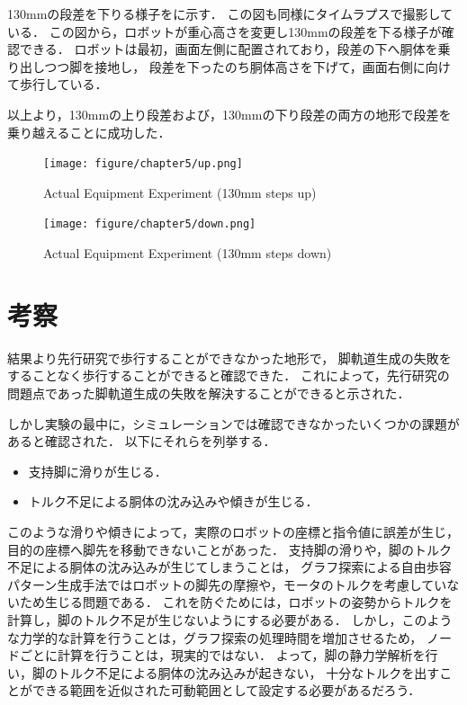 130mmの段差を下りる様子をに示す．
この図も同様にタイムラプスで撮影している．
この図から，ロボットが重心高さを変更し130mmの段差を下る様子が確認できる．
ロボットは最初，画面左側に配置されており，段差の下へ胴体を乗り出しつつ脚を接地し，
段差を下ったのち胴体高さを下げて，画面右側に向けて歩行している．

以上より，130mmの上り段差および，130mmの下り段差の両方の地形で段差を乗り越えることに成功した．

\begin{figure}[h]
  \centering
  \texttt{[image: figure/chapter5/up.png]}
  \caption{Actual Equipment Experiment (130mm steps up)}
  \label{fig:ch5_experiment_1}  %
\end{figure}

\begin{figure}[h]
  \centering
  \texttt{[image: figure/chapter5/down.png]}
  \caption{Actual Equipment Experiment (130mm steps down)}
  \label{fig:ch5_experiment_2}  %
\end{figure}

\section{考察}
結果より先行研究で歩行することができなかった地形で，
脚軌道生成の失敗をすることなく歩行することができると確認できた．
これによって，先行研究の問題点であった脚軌道生成の失敗を解決することができると示された．

しかし実験の最中に，シミュレーションでは確認できなかったいくつかの課題があると確認された．
以下にそれらを列挙する．

\begin{itemize}
  \item 支持脚に滑りが生じる．
  \item トルク不足による胴体の沈み込みや傾きが生じる．
\end{itemize}

このような滑りや傾きによって，実際のロボットの座標と指令値に誤差が生じ，目的の座標へ脚先を移動できないことがあった．
支持脚の滑りや，脚のトルク不足による胴体の沈み込みが生じてしまうことは，
グラフ探索による自由歩容パターン生成手法ではロボットの脚先の摩擦や，モータのトルクを考慮していないため生じる問題である．
これを防ぐためには，ロボットの姿勢からトルクを計算し，脚のトルク不足が生じないようにする必要がある．
しかし，このような力学的な計算を行うことは，グラフ探索の処理時間を増加させるため，
ノードごとに計算を行うことは，現実的ではない．
よって，脚の静力学解析を行い，脚のトルク不足による胴体の沈み込みが起きない，
十分なトルクを出すことができる範囲を近似された可動範囲として設定する必要があるだろう．

